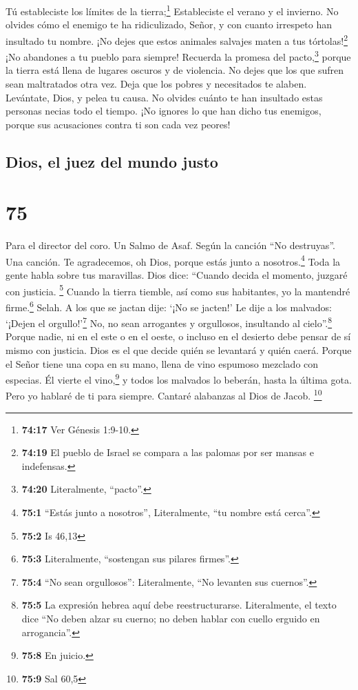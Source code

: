  Tú estableciste los límites de la tierra;\footnote{\textbf{74:17}
  Ver Génesis 1:9-10.} Estableciste el verano y el invierno.
 No olvides cómo el enemigo te ha ridiculizado, Señor, y
con cuanto irrespeto han insultado tu nombre.  ¡No dejes
que estos animales salvajes maten a tus tórtolas!\footnote{\textbf{74:19}
  El pueblo de Israel se compara a las palomas por ser mansas e
  indefensas.} ¡No abandones a tu pueblo para siempre! 
Recuerda la promesa del pacto,\footnote{\textbf{74:20} Literalmente,
  ``pacto''.} porque la tierra está llena de lugares oscuros y de
violencia.  No dejes que los que sufren sean maltratados
otra vez. Deja que los pobres y necesitados te alaben. 
Levántate, Dios, y pelea tu causa. No olvides cuánto te han insultado
estas personas necias todo el tiempo.  ¡No ignores lo que
han dicho tus enemigos, porque sus acusaciones contra ti son cada vez
peores!

\hypertarget{dios-el-juez-del-mundo-justo}{%
\subsection{Dios, el juez del mundo
justo}\label{dios-el-juez-del-mundo-justo}}

\hypertarget{section-74}{%
\section{75}\label{section-74}}

Para el director del coro. Un Salmo de Asaf. Según la canción ``No
destruyas''. Una canción.  Te agradecemos, oh Dios, porque
estás junto a nosotros.\footnote{\textbf{75:1} ``Estás junto a
  nosotros'', Literalmente, ``tu nombre está cerca''.} Toda la gente
habla sobre tus maravillas.  Dios dice: ``Cuando decida el
momento, juzgaré con justicia. \footnote{\textbf{75:2} Is 46,13}
 Cuando la tierra tiemble, así como sus habitantes, yo la
mantendré firme.\footnote{\textbf{75:3} Literalmente, ``sostengan sus
  pilares firmes''.} Selah.  A los que se jactan dije:
`¡No se jacten!' Le dije a los malvados: `¡Dejen el orgullo!'\footnote{\textbf{75:4}
  ``No sean orgullosos'': Literalmente, ``No levanten sus cuernos''.}
 No, no sean arrogantes y orgullosos, insultando al
cielo''.\footnote{\textbf{75:5} La expresión hebrea aquí debe
  reestructurarse. Literalmente, el texto dice ``No deben alzar su
  cuerno; no deben hablar con cuello erguido en arrogancia''.}
 Porque nadie, ni en el este o en el oeste, o incluso en
el desierto debe pensar de sí mismo con justicia.  Dios es
el que decide quién se levantará y quién caerá.  Porque el
Señor tiene una copa en su mano, llena de vino espumoso mezclado con
especias. Él vierte el vino,\footnote{\textbf{75:8} En juicio.} y todos
los malvados lo beberán, hasta la última gota.  Pero yo
hablaré de ti para siempre. Cantaré alabanzas al Dios de Jacob.
\footnote{\textbf{75:9} Sal 60,5}

